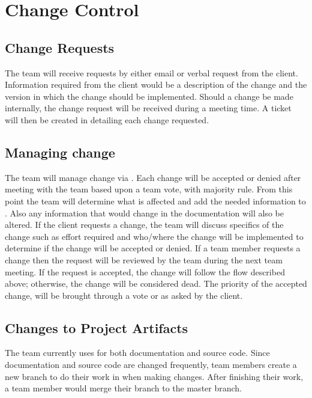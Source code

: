 \section{Change Control}
\subsection{Change Requests}
The team will receive requests by either email or verbal request from the client.  Information required from the client would be a description of the change and the version in which the change should be implemented.  Should a change be made internally, the change request will be received during a meeting time. A ticket will then be created in  detailing each change requested.

\subsection{Managing change}
The team will manage change via . Each change will be accepted or denied after meeting with the team based upon a team vote, with majority rule. From this point the team will determine what is affected and add the needed information to . Also any information that would change in the documentation will also be altered. If the client requests a change, the team will discuss specifics of the change such as effort required and who/where the change will be implemented to determine if the change will be accepted or denied. If a team member requests a change then the request will be reviewed by the team during the next team meeting.  If the request is accepted, the change will follow the flow described above; otherwise, the change will be considered dead.  The priority of the accepted change, will be brought through a vote or as asked by the client.

\subsection{Changes to Project Artifacts}
The team currently uses  for both documentation and source code.  Since documentation and source code are changed frequently, team members create a new branch to do their work in when making changes.  After finishing their work, a team member would merge their branch to the master branch.
